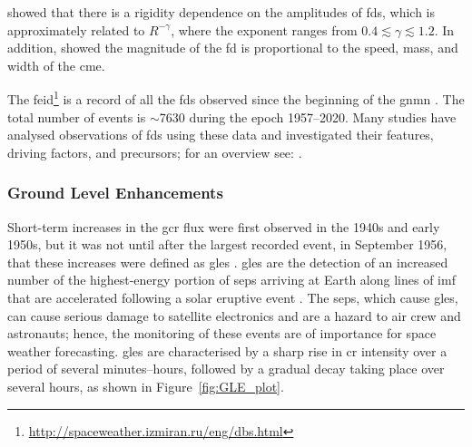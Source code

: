\citet{lockwood_forbush_1971} showed that there is a rigidity dependence on the amplitudes of \glspl{fd}, which is approximately related to $R^{-\gamma}$, where the exponent ranges from $0.4\lesssim\gamma\lesssim1.2$. In addition, \citet{belov_what_2001, belov_coronal_2014} showed the magnitude of the \gls{fd} is proportional to the speed, mass, and width of the \gls{cme}. 


The \gls{feid}\footnote{\url{http://spaceweather.izmiran.ru/eng/dbs.html}} is a record of all the \glspl{fd} observed since the beginning of the \gls{gnmn} \citep{mishev_current_2020}. The total number of events is $\sim$7630 during the epoch 1957--2020. Many studies have analysed observations of \glspl{fd} using these data and investigated their features, driving factors, and precursors; for an overview see: \citet{belov_what_2001, usoskin_forbush_2008, wawrzynczak_modeling_2010, rockenbach_global_2014, arunbabu_how_2015}.



\subsubsection*{Ground Level Enhancements}\label{sec:intro_GLEs}

Short-term increases in the \gls{gcr} flux were first observed in the 1940s and early 1950s, but it was not until after the largest recorded event, in September 1956, that these increases were defined as \glspl{gle} \citep{cramp_modelling_1996}. \glspl{gle} are the detection of an increased number of the highest-energy portion \cite[$> 500$~MeV,][]{kuwabara_development_2006} of \glspl{sep} arriving at Earth along lines of \gls{imf} that are accelerated following a solar eruptive event \citep{mccracken_high-energy_2012, poluianov_revisited_2017}. The \glspl{sep}, which cause \glspl{gle}, can cause serious damage to satellite electronics and are a hazard to air crew and astronauts; hence, the monitoring of these events are of importance for space weather forecasting. \glspl{gle} are characterised by a sharp rise in \gls{cr} intensity over a period of several minutes--hours, followed by a gradual decay taking place over several hours, as shown in Figure~\ref{fig:GLE_plot}. 

